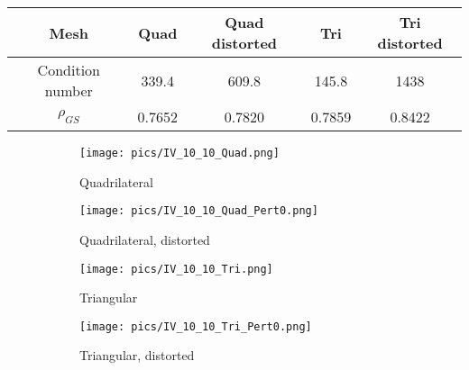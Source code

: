 \begin{table}[htbp!]
    \centering
    \caption{}
    \label{tab:cond_and_rho}
    \setlength{\tabcolsep}{12.5pt} %
    \renewcommand{\arraystretch}{1.2}
    \begin{tabular}{ c c c c c}
        \toprule
        Mesh & Quad & Quad distorted & Tri & Tri distorted \\
        \midrule
        Condition number &339.4 & 609.8 & 145.8 & 1438 \\
        $\rho_{GS}$ &0.7652 & 0.7820 & 0.7859 & 0.8422\\
    \bottomrule
    \end{tabular}
\end{table}

\begin{figure}[htbp]
   \centering
   \begin{subfigure}{0.4\textwidth}
       \texttt{[image: pics/IV\_10\_10\_Quad.png]}
       \caption[]{Quadrilateral}
   \end{subfigure}
   \begin{subfigure}{0.4\textwidth}
       \texttt{[image: pics/IV\_10\_10\_Quad\_Pert0.png]}
       \caption[]{Quadrilateral, distorted}
   \end{subfigure}
   \begin{subfigure}{0.4\textwidth}
       \texttt{[image: pics/IV\_10\_10\_Tri.png]}
       \caption[]{Triangular}
   \end{subfigure}
   \begin{subfigure}{0.4\textwidth}
       \texttt{[image: pics/IV\_10\_10\_Tri\_Pert0.png]}
       \caption[]{Triangular, distorted}
   \end{subfigure}
   \caption{}
   \label{fig:meshes_test_cond}
\end{figure}

